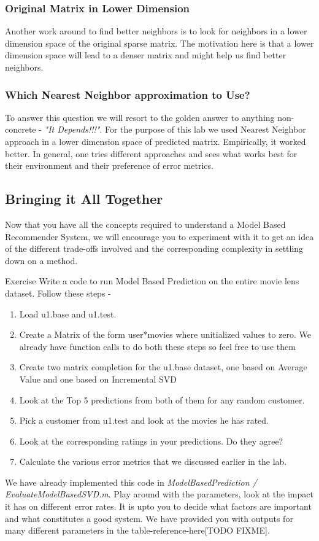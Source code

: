   \subsubsection{Original Matrix in Lower Dimension}
  Another work around to find better neighbors is to look for neighbors in a lower dimension space of the original sparse matrix. The motivation here is that a lower dimension space will lead to a denser matrix and might help us find better neighbors.
  \subsubsection{Which Nearest Neighbor approximation to Use?}
  To answer this question we will resort to the golden answer to anything non-concrete - \textit{"It Depends!!!"}. For the purpose of this lab we used Nearest Neighbor approach in a lower dimension space of predicted matrix. Empirically, it worked better. In general, one tries different approaches and sees what works best for their environment and their preference of error metrics.
  \subsection{Bringing it All Together}
  Now that you have all the concepts required to understand a Model Based Recommender System, we will encourage you to experiment with it to get an idea of the different trade-offs involved and the corresponding complexity in settling down on a method.
\begin{myremark}{Exercise }
Write a code to run Model Based Prediction on the entire movie lens dataset. Follow these steps - 
\begin{enumerate}
\item Load u1.base and u1.test.
\item Create a Matrix of the form user*movies where unitialized values to zero. We already have function calls to do both these steps so feel free to use them
\item Create two matrix completion for the u1.base dataset, one based on Average Value and one based on Incremental SVD
\item Look at the Top 5 predictions from both of them for any random customer.
\item Pick a customer from u1.test and look at the movies he has rated. 
\item Look at the corresponding ratings in your predictions. Do they agree?
\item Calculate the various error metrics that we discussed earlier in the lab.
\end{enumerate}
We have already implemented this code in \textit{ModelBasedPrediction / EvaluateModelBasedSVD.m}. Play around with the parameters, look at the impact it has on different error rates. It is upto you to decide what factors are important and what constitutes a good system. We have provided you with outputs for many different parameters in the table-reference-here[TODO FIXME].
\end{myremark}
